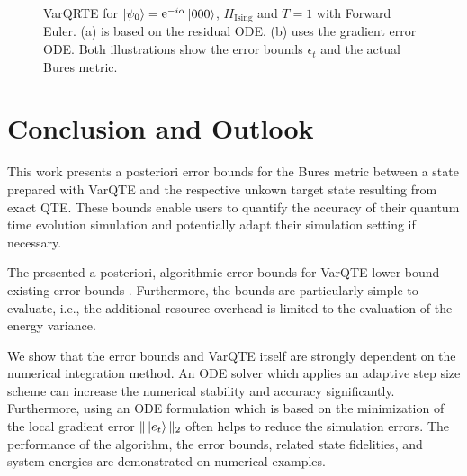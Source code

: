 \documentclass[twocolumn, aps, pra, superscriptaddress]{revtex4-1}
\DeclareMathOperator{\ee}{e}
\begin{document}
\begin{figure}[!ht]
    \centering
    \captionsetup{singlelinecheck = false, format= hang, justification=centerlast, font=footnotesize, labelsep=space}
    \caption{VarQRTE for $\ket{\psi_0}=\ee^{-i\alpha}\ket{000}$, $H_{\text{Ising}}$ and $T=1$ with Forward Euler. (a) is based on the residual ODE.  (b) uses the gradient error ODE. Both illustrations show the error bounds $\epsilon_t$ and the actual Bures metric.}
    \label{fig:ising_noisy_varqrte}
\end{figure}



\section{Conclusion and Outlook}
\label{sec:conclusions}
This work presents a posteriori error bounds for the Bures metric between a state prepared with VarQTE and the respective unkown target state resulting from exact QTE.
These bounds enable users to quantify the accuracy of their quantum time evolution simulation and potentially adapt their simulation setting if necessary.

The presented a posteriori, algorithmic error bounds for VarQTE lower bound existing error bounds \cite{MartinazzoErrorVarQuantumDyn20, Endo_2020VarQTEGeneralProcesses}. Furthermore, the bounds are particularly simple to evaluate, i.e., the additional resource overhead is limited to the evaluation of the energy variance.

We show that the error bounds and VarQTE itself are strongly dependent on the numerical integration method. An ODE solver which applies an adaptive step size scheme can increase the numerical stability and accuracy significantly. Furthermore, using an ODE formulation which is based on the minimization of the local gradient error $\|\ket{e_t}\|_2$ often helps to reduce the simulation errors.
The performance of the algorithm, the error bounds, related state fidelities, and system energies are demonstrated on numerical examples.
\end{document}
